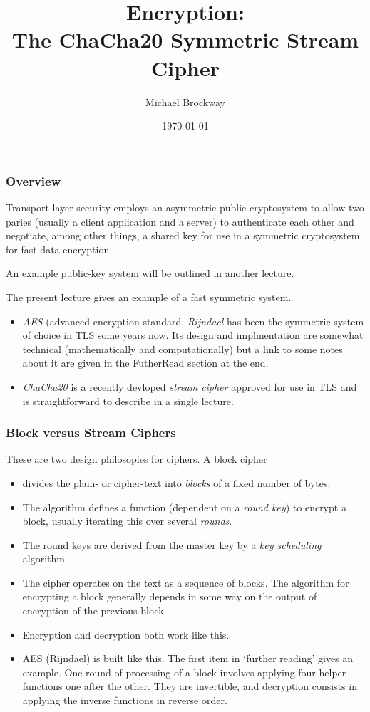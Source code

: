 \documentclass[10pt, hyperref={pdfpagelabels=false}]{beamer}
\title{Encryption:\\The ChaCha20 Symmetric Stream Cipher}
\author{Michael Brockway}
\date{\today}
\begin{document}
\begin{frame}
\titlepage
\end{frame}

\begin{frame}
\frametitle{Overview}
Transport-layer security employs an asymmetric public cryptosystem to allow two paries (usually a client application and a server) to authenticate each other and negotiate, among other things, a shared key for use in a symmetric cryptosystem for fast data encryption.

An example public-key system will be outlined in another lecture.

The present lecture gives an example of a fast symmetric system.
\begin{itemize}
\item \emph{AES} (advanced encryption standard, \emph{Rijndael} has been the symmetric system of choice in TLS some years now. Its design and implmentation are somewhat technical (mathematically and computationally) but a link to some notes about it are given in the FutherRead section at the end.
\item \emph{ChaCha20} is a recently devloped \emph{stream cipher} approved for use in TLS and is straightforward to describe in a single lecture.
\end{itemize}
\end{frame}

\begin{frame}
\frametitle{Block versus Stream Ciphers}
These are two design philosopies for ciphers. A block cipher 
\begin{itemize}
\item divides the plain- or cipher-text into \emph{blocks} of a fixed number of bytes.
\item The algorithm defines a function (dependent on a \emph{round key}) to encrypt a block, usually iterating this over several \emph{rounds}.
\item The round keys are derived from the master key by a \emph{key scheduling} algorithm.
\item The cipher operates on the text as a sequence of blocks. The algorithm for encrypting a block generally depends in some way on the output of encryption of the previous block.
\item Encryption and decryption both work like this.
\item AES (Rijndael) is built like this. The first item in `further reading' gives an example. One round of processing of a block involves applying four helper functions one after the other. They are invertible, and decryption consists in applying the inverse functions in reverse order.
\end{itemize}
\end{frame}
\end{document}
